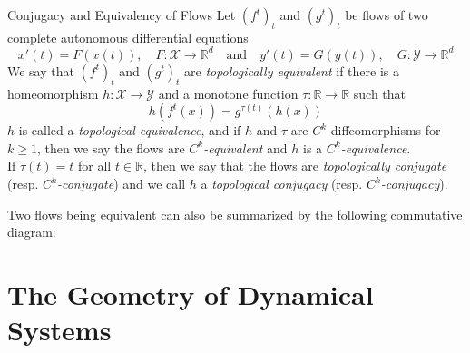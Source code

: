 \documentclass[11pt, a4paper]{memoir}
\theoremstyle{break}
\theoremstyle{break}
\theoremstyle{nonumberplain}
\newcommand{\mR}{\mathbb{R}}
\begin{document}
\begin{mydefinition}{Conjugacy and Equivalency of Flows}
Let $(f^t)_t$ and $(g^t)_t$ be flows of two complete autonomous differential equations
$$x'(t)=F(x(t)), \quad F:\mathcal{X}\to\mR^d\quad\text{and}\quad y'(t)=G(y(t)),\quad G:\mathcal{Y}\to\mR^d$$
We say that $(f^t)_t$ and $(g^t)_t$ are \emph{topologically equivalent} if there is a homeomorphism $h:\mathcal{X}\to\mathcal{Y}$ and a monotone function $\tau:\mR\to\mR$ such that
$$h(f^t(x))=g^{\tau(t)}(h(x))$$
$h$ is called a \emph{topological equivalence}, and if $h$ and $\tau$ are $C^k$ diffeomorphisms for $k\geqslant 1$, then we say the flows are \emph{$C^k$-equivalent} and $h$ is a \emph{$C^k$-equivalence}.\\[5pt]
If $\tau(t)=t$ for all $t\in \mR$, then we say that the flows are \emph{topologically conjugate} (resp. \emph{$C^k$-conjugate}) and we call $h$ a \emph{topological conjugacy} (resp. \emph{$C^k$-conjugacy}).
\end{mydefinition}
\noindent Two flows being equivalent can also be summarized by the following commutative diagram:
\begin{center}
\end{center}





\section{The Geometry of Dynamical Systems}
\end{document}
